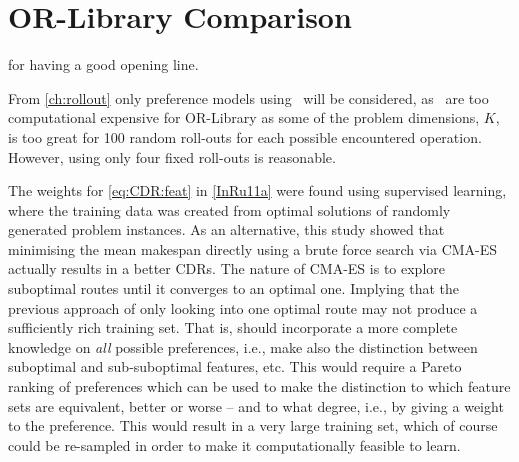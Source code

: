 

\chapter{OR-Library Comparison}\label{ch:experiments} 

 for having a good opening line. 


From \cref{ch:rollout} only preference models using \phiSDRRelated\ will be 
considered, as \phiRNDRelated\ are too computational expensive for OR-Library 
as some of the problem dimensions, $K$, is too great for 100 random roll-outs 
for each possible encountered operation. However, using only four fixed 
roll-outs is reasonable.



The weights for \cref{eq:CDR:feat} in \cref{InRu11a} were found using 
supervised learning, where the training data was created from optimal solutions 
of randomly generated problem instances. As an alternative, this study showed  
that minimising the mean makespan directly using a brute force search via 
CMA-ES actually results in a better CDRs. The nature of CMA-ES is to explore 
suboptimal routes until it converges to an optimal one. Implying that the 
previous approach of only looking into one optimal route may not produce a 
sufficiently rich training set. That is, \PhiSet{\pi} should incorporate a 
more complete knowledge on \emph{all} possible preferences, i.e., make also the 
distinction between suboptimal and sub-suboptimal features, etc.  This would 
require a Pareto ranking of preferences which can be used to make the 
distinction to which feature sets are equivalent, better or worse -- and to 
what degree, i.e., by giving a weight to the preference. This would result in a 
very large training set, which of course could be re-sampled in order to make 
it computationally feasible to learn.
